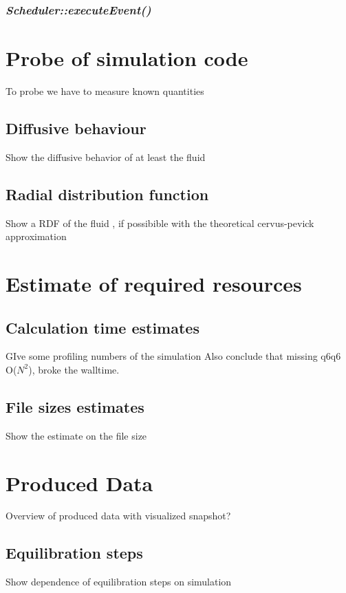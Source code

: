 \subsubsection{\quad \textit{Scheduler::executeEvent()}}


\section{Probe of simulation code}
\label{sec:probe}
To probe we have to measure known quantities
\subsection{Diffusive behaviour}
\label{sec:diffusion_probe}
Show the diffusive behavior of at least the fluid

\subsection{Radial distribution function}
\label{sec:RDF_prob}
Show a RDF of the fluid , if possibible with the theoretical cervus-pevick approximation


\section{Estimate of required resources}
\label{sec:resources}

\subsection{Calculation time estimates}
\label{sec:calc_times}
GIve some profiling numbers of the simulation
Also conclude that missing q6q6 O($N^2$), broke the walltime.

\subsection{File sizes estimates}
\label{sec:file_size}
Show the estimate on the file size

\section{Produced Data}
\label{sec:data}
Overview of produced data with visualized snapshot?

\subsection{Equilibration steps}
\label{sec:eq_steps}
Show dependence of equilibration steps on simulation

